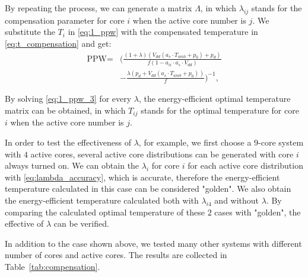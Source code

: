 
By repeating the process, we can generate a matrix $\Lambda$, in which $\lambda_{ij}$ stands for the compensation parameter for core $i$ when the active core number is $j$. We substitute the $T_{i}$ in \eqref{eq:1_ppw} with the compensated temperature in \eqref{eq:t_compensation} and get:
\begin{equation}\label{eq:1_ppw_3}
\begin{split}
\text{PPW} =& (\frac{(1+\lambda)(V_{dd}(a_{s}\cdot T_{amb}+p_{0})+p_{d})}{f(1-a_{ii} \cdot a_{s} \cdot V_{dd})}\\
&-\frac{\lambda(p_{d}+V_{dd}(a_{s}\cdot T_{amb}+p_{0}))}{f})^{-1},
\end{split}
\end{equation}

By solving \eqref{eq:1_ppw_3} for every $\lambda$, the energy-efficient optimal temperature matrix can be obtained, in which $T_{ij}$ stands for the optimal temperature for core $i$ when the active core number is $j$.

In order to test the effectiveness of $\lambda$, for example, we first choose a $9$-core system with $4$ active cores, several active core distributions can be generated with core $i$ always turned on. We can obtain the $\lambda_{i}$ for core $i$ for each active core distribution with \eqref{eq:lambda_accuracy}, which is accurate, therefore the energy-efficient temperature calculated in this case can be considered "golden". We also obtain the energy-efficient temperature calculated both with $\lambda_{i4}$ and without $\lambda$. By comparing the calculated optimal temperature of these $2$ cases with "golden", the effective of $\lambda$ can be verified.

In addition to the case shown above, we tested many other systems with different number of cores and active cores. The results are collected in Table~\ref{tab:compensation}.

